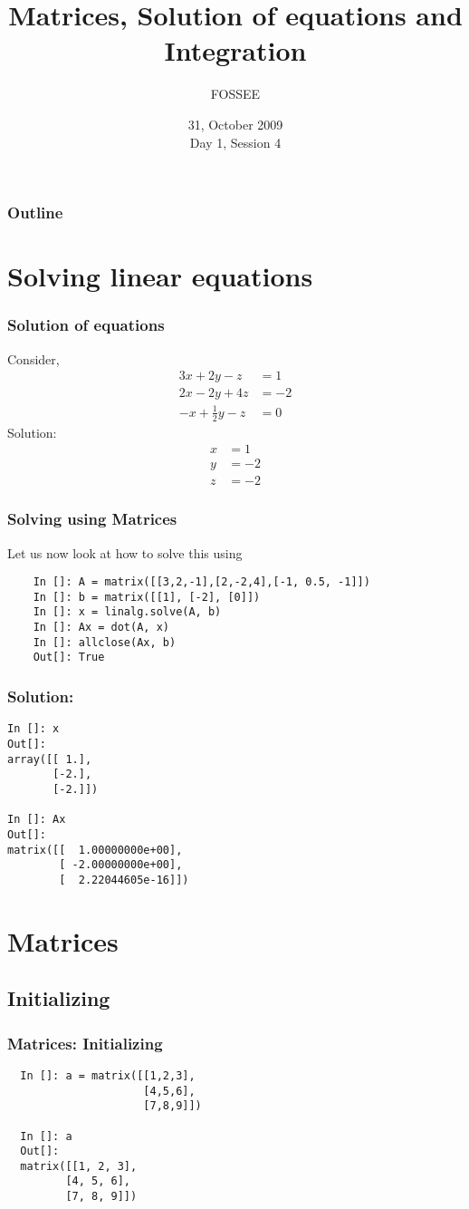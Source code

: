 \documentclass[14pt,compress]{beamer}
\title[Basic Python]{Matrices, Solution of equations and Integration\\}
\author[FOSSEE] {FOSSEE}
\institute[IIT Bombay] {Department of Aerospace Engineering\\IIT Bombay}
\date[] {31, October 2009\\Day 1, Session 4}
\newcommand{\kwrd}[1]{ \texttt{\textbf{\color{blue}{#1}}}  }
\begin{document}
\begin{frame}
  \titlepage
\end{frame}

\begin{frame}
  \frametitle{Outline}
  \tableofcontents
\end{frame}

\section{Solving linear equations}
\begin{frame}[fragile]
\frametitle{Solution of equations}
Consider,
  \begin{align*}
    3x + 2y - z  & = 1 \\
    2x - 2y + 4z  & = -2 \\
    -x + \frac{1}{2}y -z & = 0
  \end{align*}
Solution:
  \begin{align*}
    x & = 1 \\
    y & = -2 \\
    z & = -2
  \end{align*}
\end{frame}

\begin{frame}[fragile]
\frametitle{Solving using Matrices}
Let us now look at how to solve this using \kwrd{matrices}
  \begin{lstlisting}
    In []: A = matrix([[3,2,-1],[2,-2,4],[-1, 0.5, -1]])
    In []: b = matrix([[1], [-2], [0]])
    In []: x = linalg.solve(A, b)
    In []: Ax = dot(A, x)
    In []: allclose(Ax, b)
    Out[]: True
  \end{lstlisting}
\end{frame}

\begin{frame}[fragile]
\frametitle{Solution:}
\begin{lstlisting}
In []: x
Out[]: 
array([[ 1.],
       [-2.],
       [-2.]])

In []: Ax
Out[]: 
matrix([[  1.00000000e+00],
        [ -2.00000000e+00],
        [  2.22044605e-16]])
\end{lstlisting}
\end{frame}

\section{Matrices}
\subsection{Initializing}
\begin{frame}[fragile]
\frametitle{Matrices: Initializing}
\begin{lstlisting}
  In []: a = matrix([[1,2,3],
                     [4,5,6],
                     [7,8,9]])

  In []: a
  Out[]: 
  matrix([[1, 2, 3],
         [4, 5, 6],
         [7, 8, 9]])
\end{lstlisting}
\end{frame}
\end{document}
